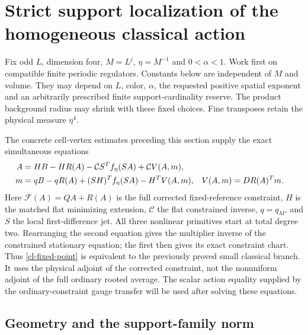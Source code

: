 \documentclass[11pt]{article}
\theoremstyle{remark}\newtheorem{remark}[theorem]{Remark}
\begin{document}
\section{Strict support localization of the homogeneous classical action}
\label{cl-section}

Fix odd $L$, dimension four, $M=L^j$, $\eta=M^{-1}$ and
$0<\alpha<1$. Work first on compatible finite periodic regulators.
Constants below are independent of $M$ and volume. They may depend on
$L$, color, $\alpha$, the requested positive spatial exponent and an
arbitrarily prescribed finite support-cardinality reserve. The product
background radius may shrink with these fixed choices. Fine transposes
retain the physical measure $\eta^4$.

The concrete cell-vertex estimates preceding this section supply the
exact simultaneous equations
\begin{align}
 A&=HB-HR(A)-\mathcal C S^T f_\eta(SA)
                         +\mathcal C V(A,m),\notag\\
 m&=qB-qR(A)+(SH)^T f_\eta(SA)-H^T V(A,m),
 &V(A,m)&=DR(A)^Tm.                                      \label{cl-fixed-point}
\end{align}
Here $\mathcal F(A)=QA+R(A)$ is the full corrected fixed-reference
constraint, $H$ is the matched flat minimizing extension,
$\mathcal C$ the flat constrained inverse, $q=q_M$, and $S$ the local
first-difference jet. All three nonlinear primitives start at total
degree two. Rearranging the second equation gives the multiplier inverse
of the constrained stationary equation; the first then gives its exact
constraint chart. Thus \eqref{cl-fixed-point} is equivalent to the
previously proved small classical branch. It uses the physical adjoint
of the corrected constraint, not the nonuniform adjoint of the full
ordinary rooted average. The scalar action equality supplied by the
ordinary-constraint gauge transfer will be used after solving these
equations.

\subsection{Geometry and the support-family norm}
\label{cl-geometry-section}
\end{document}

